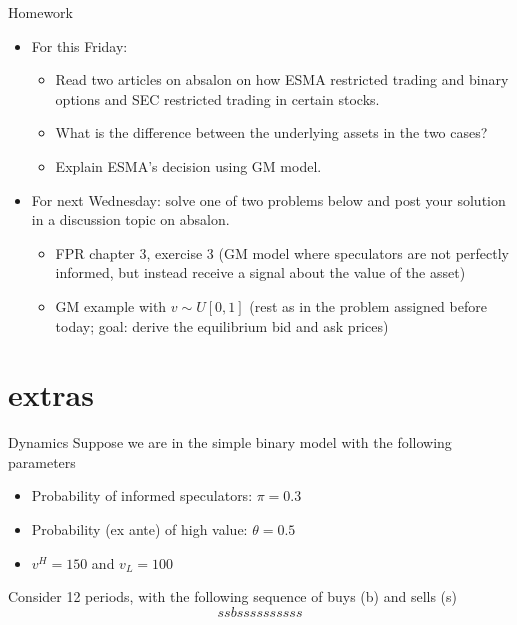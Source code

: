 \documentclass[english,10pt
,aspectratio=169
]{beamer}
\begin{document}
\begin{frame}{Homework}
	\begin{itemize}
		\item For this Friday:
		\begin{itemize}
			\item Read two articles on absalon on how ESMA restricted trading and binary options and SEC restricted trading in certain stocks.
			\item What is the difference between the underlying assets in the two cases?
			\item Explain ESMA's decision using GM model.
		\end{itemize}
		\item For next Wednesday: solve one of two problems below and post your solution in a discussion topic on absalon.
		\begin{itemize}
			\item FPR chapter 3, exercise 3 (GM model where speculators are not perfectly informed, but instead receive a signal about the value of the asset)
			\item GM example with $v \sim U[0,1]$ (rest as in the problem assigned before today; goal: derive the equilibrium bid and ask prices)
		\end{itemize}
	\end{itemize}
\end{frame}


\section{extras}

\begin{frame}[label=dynamics]{Dynamics}
	Suppose we are in the simple binary model with the following parameters
	\begin{itemize}
		\item Probability of informed speculators: $\pi = 0.3$
		\item Probability (ex ante) of high value: $\theta = 0.5$
		\item $v^H=150$ and $v_L=100$
	\end{itemize}
	Consider 12 periods, with the following sequence of buys (b) and sells (s)
	\[
	ssbssssssssss
	\]
\end{frame}
\end{document}
